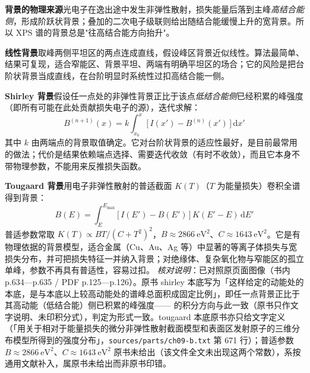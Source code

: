 \begin{principle}
\textbf{背景的物理来源}\quad 光电子在逸出途中发生非弹性散射，损失能量后落到主峰\emph{高结合能侧}，形成阶跃状背景；叠加的二次电子级联则给出随结合能缓慢上升的宽背景。所以 XPS 谱的背景总是"往高结合能方向抬升"。

\textbf{线性背景}\quad 取峰两侧平坦区的两点连成直线，假设峰区背景近似线性。算法最简单、结果可复现，适合窄能区、背景平坦、两端有明确平坦区的场合；它的风险是把台阶状背景当成直线，在台阶明显时系统性过扣高结合能一侧。

\textbf{Shirley 背景}\quad 假设任一点处的非弹性背景正比于该点\emph{低结合能侧}已经积累的峰强度（即所有可能在此处贡献损失电子的源），迭代求解：
\begin{equation}
B^{(n+1)}(x) = k\int_{x_0}^{x}\bigl[\,I(x')-B^{(n)}(x')\,\bigr]\,\mathrm{d}x'
\label{eq:ch09-shirley}
\end{equation}
其中 $k$ 由两端点的背景取值确定。它对台阶状背景的适应性最好，是目前最常用的做法；代价是结果依赖端点选择、需要迭代收敛（有时不收敛），而且它本身不带物理参数，不能用来反推损失函数。

\textbf{Tougaard 背景}\quad 用电子非弹性散射的普适截面 $K(T)$（$T$ 为能量损失）卷积全谱得到背景：
\begin{equation}
B(E) = \int_{E}^{E_{\max}} \bigl[\,I(E')-B(E')\,\bigr]\,K(E'-E)\,\mathrm{d}E'
\label{eq:ch09-tougaard}
\end{equation}
普适参数常取 $K(T)\propto BT/(C+T^{2})^{2}$，$B\approx2866\ \mathrm{eV^{2}}$、$C\approx1643\ \mathrm{eV^{2}}$。它是有物理依据的背景模型，适合金属（Cu、Au、Ag 等）中显著的等离子体损失与宽损失分布，并可把损失特征一并纳入背景；对绝缘体、复杂氧化物与窄能区的孤立单峰，参数不再具有普适性，容易过扣。
\emph{核对说明}：已对照原页面图像（书内 p.634—p.635 / PDF p.125—p.126）。原书 shirley 本底写为「这样给定的动能处的本底，是与本底以上较高动能处的谱峰总面积成固定比例」，即任一点背景正比于其高动能（低结合能）侧已积累的峰强度—— 的积分方向与此一致（原书只作文字说明、未印积分式），判定为形式一致。tougaard 本底原书亦只给文字定义（「用关于相对于能量损失的微分非弹性散射截面模型和表面区发射原子的三维分布模型所得到的强度分布」，\texttt{sources/parts/ch09-b.txt} 第 671 行）；普适参数 $B\approx2866\ \mathrm{eV^{2}}$、$C\approx1643\ \mathrm{eV^{2}}$ 原书未给出（该文件全文未出现这两个常数），系按通用文献补入，属原书未给出而非原书印错。
\end{principle}

